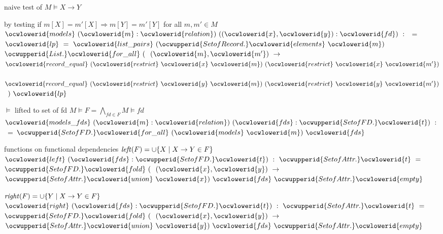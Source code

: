 \documentclass[12pt]{article}
\begin{document}
\ocwendcode{}\ocwindent{0.00em}
naive test of $M \models X \to Y$

  by testing if $m[X]=m'[X] \Rightarrow m[Y]=m'[Y]$ for all $m,m' \in M$ 
\ocweol
\label{rellens.ml:7513}%
\medskip
\ocwbegincode{}\ocwindent{0.00em}
~$\ocwlowerid{models}~(\ocwlowerid{m}:\ocwlowerid{relation})~((\ocwlowerid{x},\ocwlowerid{y}):\ocwlowerid{fd})~:~$~=\ocweol
\ocwindent{1.00em}
~$\ocwlowerid{lp}~=~\ocwlowerid{list\_pairs}~(\ocwupperid{SetofRecord.}\ocwlowerid{elements}~\ocwlowerid{m})~$\ocweol
\ocwindent{1.00em}
$\ocwupperid{List.}\ocwlowerid{for\_all}~($~$(\ocwlowerid{m},\ocwlowerid{m'})~\rightarrow{}$\ocweol
\ocwindent{2.00em}
~$\ocwlowerid{record\_equal}~(\ocwlowerid{restrict}~\ocwlowerid{x}~\ocwlowerid{m})~(\ocwlowerid{restrict}~\ocwlowerid{x}~\ocwlowerid{m'})$\ocweol
\ocwindent{2.00em}
~$\ocwlowerid{record\_equal}~(\ocwlowerid{restrict}~\ocwlowerid{y}~\ocwlowerid{m})~(\ocwlowerid{restrict}~\ocwlowerid{y}~\ocwlowerid{m'})$\ocweol
\ocwindent{2.00em}
~$)~\ocwlowerid{lp}$\medskip

\ocwendcode{}\ocwindent{0.00em}
$\models$ lifted to set of fd 
\ocweol
\ocwindent{0.00em}
$M \models F = \bigwedge_{\mathit{fd}\in F} M \models \mathit{fd}$ 
\ocweol
\label{rellens.ml:7875}%
\medskip
\ocwbegincode{}\ocwindent{0.00em}
~$\ocwlowerid{models\_fds}~(\ocwlowerid{m}:\ocwlowerid{relation})~(\ocwlowerid{fds}:\ocwupperid{SetofFD.}\ocwlowerid{t})~:~$~=\ocweol
\ocwindent{1.00em}
$\ocwupperid{SetofFD.}\ocwlowerid{for\_all}~(\ocwlowerid{models}~\ocwlowerid{m})~\ocwlowerid{fds}$\medskip

\ocwendcode{}\ocwindent{0.00em}
functions on functional dependencies 
\ocweol
\ocwindent{0.00em}
$\mathit{left}(F) = \cup\{ X \mid  X \to Y \in F\}$ 
\ocweol
\label{rellens.ml:8060}%
\medskip
\ocwbegincode{}\ocwindent{0.00em}
~$\ocwlowerid{left}~(\ocwlowerid{fds}:\ocwupperid{SetofFD.}\ocwlowerid{t})~:~\ocwupperid{SetofAttr.}\ocwlowerid{t}~=~$\ocweol
\ocwindent{2.00em}
$\ocwupperid{SetofFD.}\ocwlowerid{fold}~($~$(\ocwlowerid{x},\ocwlowerid{y})~\rightarrow{}$\ocweol
\ocwindent{3.00em}
$\ocwupperid{SetofAttr.}\ocwlowerid{union}~\ocwlowerid{x})~\ocwlowerid{fds}~\ocwupperid{SetofAttr.}\ocwlowerid{empty}$\medskip

\ocwendcode{}\ocwindent{0.00em}
$\mathit{right}(F) = \cup\{ Y \mid  X \to Y \in F\}$ 
\ocweol
\label{rellens.ml:8235}%
\medskip
\ocwbegincode{}\ocwindent{0.00em}
~$\ocwlowerid{right}~(\ocwlowerid{fds}:\ocwupperid{SetofFD.}\ocwlowerid{t})~:~\ocwupperid{SetofAttr.}\ocwlowerid{t}~=~$\ocweol
\ocwindent{2.00em}
$\ocwupperid{SetofFD.}\ocwlowerid{fold}~($~$(\ocwlowerid{x},\ocwlowerid{y})~\rightarrow{}$\ocweol
\ocwindent{3.00em}
$\ocwupperid{SetofAttr.}\ocwlowerid{union}~\ocwlowerid{y})~\ocwlowerid{fds}~\ocwupperid{SetofAttr.}\ocwlowerid{empty}$\medskip
\end{document}
